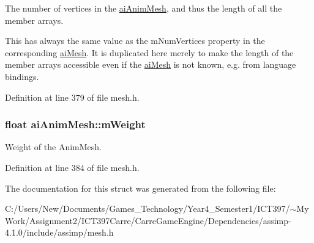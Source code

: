 The number of vertices in the \hyperlink{structai_anim_mesh}{aiAnimMesh}, and thus the length of all the member arrays.

This has always the same value as the mNumVertices property in the corresponding \hyperlink{structai_mesh}{aiMesh}. It is duplicated here merely to make the length of the member arrays accessible even if the \hyperlink{structai_mesh}{aiMesh} is not known, e.g. from language bindings. 

Definition at line 379 of file mesh.h.\hypertarget{structai_anim_mesh_3554843cf6bb042369be1e75a2eff88a}{
\subsubsection[mWeight]{\setlength{\rightskip}{0pt plus 5cm}float {\bf aiAnimMesh::mWeight}}}
\label{structai_anim_mesh_3554843cf6bb042369be1e75a2eff88a}


Weight of the AnimMesh. 

Definition at line 384 of file mesh.h.

The documentation for this struct was generated from the following file:\begin{CompactItemize}
\item 
C:/Users/New/Documents/Games\_\-Technology/Year4\_\-Semester1/ICT397/$\sim$My Work/Assignment2/ICT397Carre/CarreGameEngine/Dependencies/assimp-4.1.0/include/assimp/mesh.h\end{CompactItemize}
